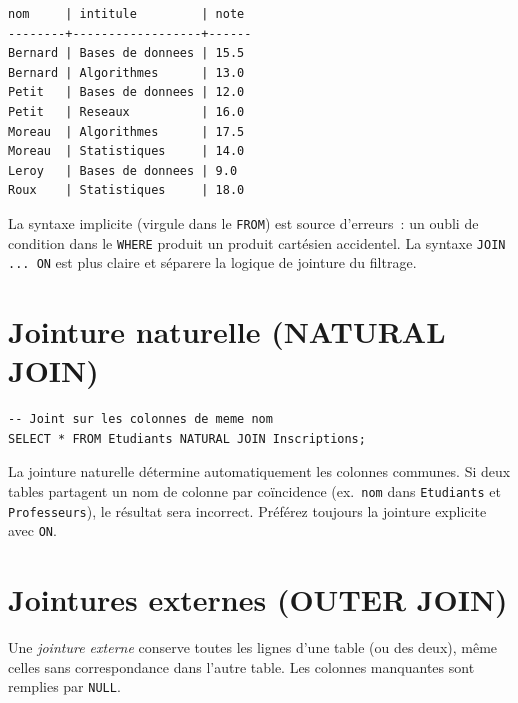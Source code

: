 \begin{codeoutput}
\begin{verbatim}
nom     | intitule         | note
--------+------------------+------
Bernard | Bases de donnees | 15.5
Bernard | Algorithmes      | 13.0
Petit   | Bases de donnees | 12.0
Petit   | Reseaux          | 16.0
Moreau  | Algorithmes      | 17.5
Moreau  | Statistiques     | 14.0
Leroy   | Bases de donnees | 9.0
Roux    | Statistiques     | 18.0
\end{verbatim}
\end{codeoutput}

\begin{bonnepratique}[title=\textbf{Toujours utiliser la syntaxe explicite JOIN}]
La syntaxe implicite (virgule dans le \texttt{FROM}) est source d'erreurs~:
un oubli de condition dans le \texttt{WHERE} produit un produit cart\'esien
accidentel. La syntaxe \texttt{JOIN ... ON} est plus claire et s\'eparere
la logique de jointure du filtrage.
\end{bonnepratique}

\section{Jointure naturelle (NATURAL JOIN)}

\begin{codeblock}[title=\textbf{Jointure naturelle}]
\begin{verbatim}
-- Joint sur les colonnes de meme nom
SELECT * FROM Etudiants NATURAL JOIN Inscriptions;
\end{verbatim}
\end{codeblock}

\begin{attention}[title=\textbf{Danger de NATURAL JOIN}]
La jointure naturelle d\'etermine automatiquement les colonnes communes.
Si deux tables partagent un nom de colonne par co\"incidence (ex.\ \texttt{nom}
dans \texttt{Etudiants} et \texttt{Professeurs}), le r\'esultat sera incorrect.
Pr\'ef\'erez toujours la jointure explicite avec \texttt{ON}.
\end{attention}

\section{Jointures externes (OUTER JOIN)}

\begin{definition}
Une \emph{jointure externe} conserve toutes les lignes d'une table (ou des deux),
m\^eme celles sans correspondance dans l'autre table. Les colonnes manquantes
sont remplies par \texttt{NULL}.
\end{definition}


